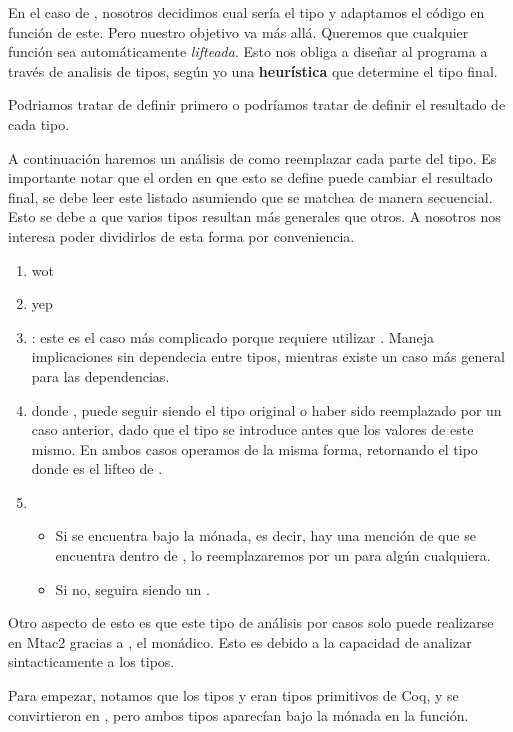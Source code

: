 En el caso de , nosotros decidimos cual sería el tipo y adaptamos el
código en función de este. Pero nuestro objetivo va más allá. Queremos que
cualquier función sea automáticamente \textit{lifteada}. Esto nos obliga a
diseñar al programa a través de analisis de tipos, según yo una
\textbf{heurística} que determine el tipo final.

Podriamos tratar de definir  primero o podríamos tratar de definir el
resultado de cada tipo.

A continuación haremos un análisis de como reemplazar cada parte del tipo. Es
importante notar que el orden en que esto se define puede cambiar el resultado
final, se debe leer este listado asumiendo que se matchea de manera secuencial.
Esto se debe a que varios tipos resultan más generales que otros. A nosotros nos
interesa poder dividirlos de esta forma por conveniencia.

\begin{enumerate}
\item {} wot
\item {} yep
\item {}: este es el caso más complicado porque requiere utilizar
  . Maneja implicaciones sin dependecia entre tipos, mientras
  existe un caso más general para las dependencias.
\item {} donde ,  puede seguir siendo el
  tipo original o haber sido reemplazado por un caso anterior, dado que el tipo
  se introduce antes que los valores de este mismo. En ambos casos operamos de
  la misma forma, retornando el tipo  donde 
  es el lifteo de .
\item {}
  \begin{itemize}
  \item Si  se encuentra bajo la mónada, es decir, hay una mención de
     que se encuentra dentro de , lo reemplazaremos por un
     para algún  cualquiera.
  \item Si no,  seguira siendo un .
  \end{itemize}
\end{enumerate}

Otro aspecto de esto es que este tipo de análisis por casos solo puede
realizarse en Mtac2 gracias a , el  monádico. Esto es
debido a la capacidad de analizar sintacticamente a los tipos.

Para empezar, notamos que los tipos  y  eran tipos primitivos de
Coq, y se convirtieron en , pero ambos tipos aparecían bajo la
mónada en la función.